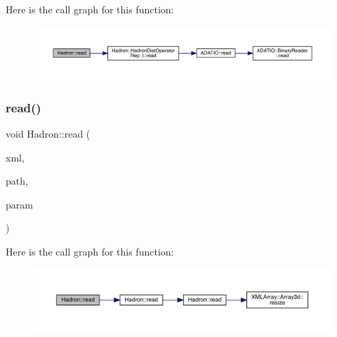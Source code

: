 Here is the call graph for this function\+:
\nopagebreak
\begin{figure}[H]
\begin{center}
\leavevmode
\includegraphics[width=350pt]{d1/daf/namespaceHadron_adeba574c3428db28a2e7054d5f4d32d6_cgraph}
\end{center}
\end{figure}
\mbox{\label{namespaceHadron_af2bd5c5dd10efe01fefda4ec1c5ce04d}} 
\subsubsection{\texorpdfstring{read()}{read()}\hspace{0.1cm}{\footnotesize\ttfamily [91/94]}}
{\footnotesize\ttfamily void Hadron\+::read (\begin{DoxyParamCaption}\item[{\mbox{\hyperlink{classADATXML_1_1XMLReader}{X\+M\+L\+Reader}} \&}]{xml,  }\item[{const std\+::string \&}]{path,  }\item[{\mbox{\hyperlink{structHadron_1_1SingleHadronQuarkFlavor__t}{Single\+Hadron\+Quark\+Flavor\+\_\+t}} \&}]{param }\end{DoxyParamCaption})}

Here is the call graph for this function\+:
\nopagebreak
\begin{figure}[H]
\begin{center}
\leavevmode
\includegraphics[width=350pt]{d1/daf/namespaceHadron_af2bd5c5dd10efe01fefda4ec1c5ce04d_cgraph}
\end{center}
\end{figure}
\mbox{\label{namespaceHadron_ae80a1bcfb7767fb7993d4a439d6493ba}} 
